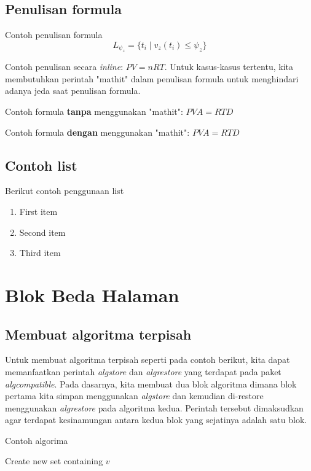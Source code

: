 \subsection{Penulisan formula}
Contoh penulisan formula
\begin{equation}
	L_{\psi_z} = \{ t_i \mid v_z(t_i) \le \psi_z \}
\end{equation}

Contoh penulisan secara \textit{inline}: $\mathit{PV = nRT}$. Untuk kasus-kasus tertentu, kita membutuhkan perintah "mathit" dalam penulisan formula untuk menghindari adanya jeda saat penulisan formula.

Contoh formula \textbf{tanpa} menggunakan "mathit": $PVA = RTD$

Contoh formula \textbf{dengan} menggunakan "mathit": $\mathit{PVA = RTD}$



\subsection{Contoh list}
Berikut contoh penggunaan list
\begin{enumerate}
	\item First item
	\item Second item
	\item Third item
\end{enumerate}

\section{Blok Beda Halaman}

\subsection{Membuat algoritma terpisah}

Untuk membuat algoritma terpisah seperti pada contoh berikut, kita dapat memanfaatkan perintah \textit{algstore} dan \textit{algrestore} yang terdapat pada paket \textit{algcompatible}. Pada dasarnya, kita membuat dua blok algoritma dimana blok pertama kita simpan menggunakan \textit{algstore} dan kemudian di-restore menggunakan \textit{algrestore} pada algoritma kedua. Perintah tersebut dimaksudkan agar terdapat kesinamungan antara kedua blok yang sejatinya adalah satu blok. 

\begin{algorithm}                     
	\caption{Contoh algorima}          
	\label{findme}                          
	\begin{algorithmic} [1]                   
		\State Create new set containing $v$
		\EndProcedure
	\end{algorithmic}
\end{algorithm}

